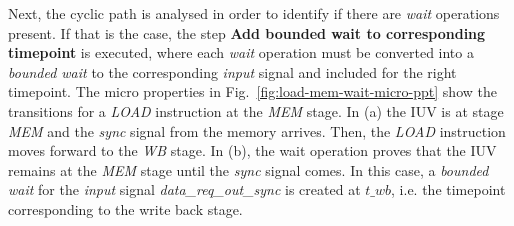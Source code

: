 Next, the cyclic path is analysed in order to identify if there are \textit{wait} operations present. If that is the case, the step \textbf{Add bounded wait to corresponding timepoint} is executed, where each \textit{wait} operation must be converted into a \textit{bounded wait} to the corresponding \textit{input} signal and included for the right timepoint. The micro properties in Fig.~\ref{fig:load-mem-wait-micro-ppt} show the transitions for a \textit{LOAD} instruction at the \textit{MEM} stage. In (a) the IUV is at stage \textit{MEM} and the \textit{sync} signal from the memory arrives. Then, the \textit{LOAD} instruction moves forward to the \textit{WB} stage. In (b), the wait operation proves that the IUV remains at the \textit{MEM} stage until the \textit{sync} signal comes. In this case, a \textit{bounded wait} for the \textit{input} signal \textit{data\_req\_out\_sync} is created at $t\_wb$, i.e. the timepoint corresponding to the write back stage.

